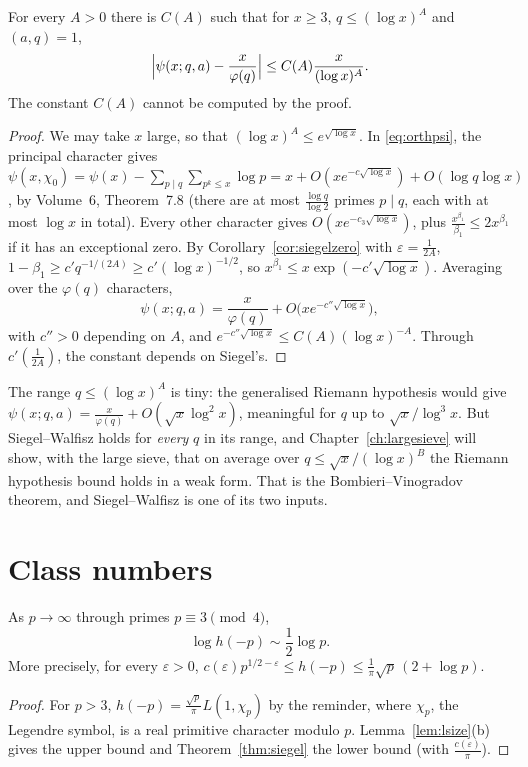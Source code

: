 \begin{corollary}\label{cor:sw}
For every $A>0$ there is $C(A)$ such that for $x\ge3$, $q\le(\log x)^A$ and $(a,q)=1$,
\[
\Bigl|\psi(x;q,a)-\frac x{\varphi(q)}\Bigr|\le C(A)\frac x{(\log x)^A}.
\]
The constant $C(A)$ cannot be computed by the proof.
\end{corollary}
\begin{proof}
We may take $x$ large, so that $(\log x)^A\le e^{\sqrt{\log x}}$. In \eqref{eq:orthpsi}, the principal character gives $\psi(x,\chi_0)=\psi(x)-\sum_{p\mid q}\sum_{p^k\le x}\log p=x+O(xe^{-c\sqrt{\log x}})+O(\log q\log x)$, by Volume~6, Theorem~7.8 (there are at most $\frac{\log q}{\log2}$ primes $p\mid q$, each with at most $\log x$
in total). Every other character gives $O(xe^{-c_3\sqrt{\log x}})$, plus $\frac{x^{\beta_1}}{\beta_1}\le2x^{\beta_1}$ if it has an exceptional zero. By Corollary~\ref{cor:siegelzero} with $\varepsilon=\frac1{2A}$, $1-\beta_1\ge c'q^{-1/(2A)}\ge c'(\log x)^{-1/2}$, so $x^{\beta_1}\le x\exp(-c'\sqrt{\log x})$. Averaging over the $\varphi(q)$ characters,
\[
\psi(x;q,a)=\frac x{\varphi(q)}+O\bigl(xe^{-c''\sqrt{\log x}}\bigr),
\]
with $c''>0$ depending on $A$, and $e^{-c''\sqrt{\log x}}\le C(A)(\log x)^{-A}$. Through $c'(\frac1{2A})$, the constant depends on Siegel's.
\end{proof}

The range $q\le(\log x)^A$ is tiny: the generalised Riemann hypothesis would give $\psi(x;q,a)=\frac x{\varphi(q)}+O(\sqrt x\log^2x)$, meaningful for $q$ up to $\sqrt x/\log^3x$. But Siegel--Walfisz holds for \emph{every} $q$ in its range, and Chapter~\ref{ch:largesieve} will show, with the large sieve, that on average over $q\le\sqrt x/(\log x)^B$
the Riemann hypothesis bound holds in a weak form. That is the Bombieri--Vinogradov theorem, and Siegel--Walfisz is one of its two inputs.

\section{Class numbers}

\begin{theorem}[Siegel, 1935]\label{thm:classnumber}
As $p\to\infty$ through primes $p\equiv3\pmod4$,
\[
\log h(-p)\sim\frac12\log p.
\]
More precisely, for every $\varepsilon>0$, $c(\varepsilon)p^{1/2-\varepsilon}\le h(-p)\le\frac1\pi\sqrt p\,(2+\log p)$.
\end{theorem}
\begin{proof}
For $p>3$, $h(-p)=\frac{\sqrt p}\pi L(1,\chi_p)$ by the reminder, where $\chi_p$, the Legendre symbol, is a real primitive character modulo $p$. Lemma~\ref{lem:lsize}(b) gives the upper bound and Theorem~\ref{thm:siegel} the lower bound (with $\frac{c(\varepsilon)}\pi$).
\end{proof}

